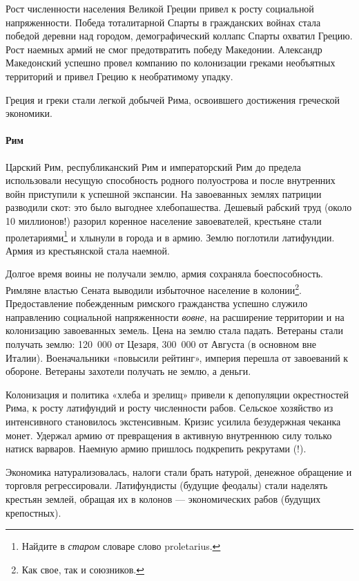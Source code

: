 Рост численности населения Великой Греции привел к росту социальной напряженности. Победа тоталитарной Спарты в
гражданских войнах стала победой деревни над городом, демографический коллапс Спарты охватил Грецию. Рост наемных армий
не смог предотвратить победу Македонии. Александр Македонский успешно провел компанию по колонизации греками необъятных
территорий и привел Грецию к необратимому упадку.

Греция и греки стали легкой добычей Рима, освоившего достижения греческой экономики.

\paragraph[Рим ]{Рим }
Царский Рим, республиканский Рим и императорский Рим до предела использовали несущую способность родного полуострова и после внутренних войн приступили к успешной экспансии. На завоеванных землях патриции разводили скот: это было
выгоднее хлебопашества. Дешевый рабский труд (около 10 миллионов!) разорил коренное население завоевателей, крестьяне
стали пролетариями\footnote{Найдите в \textit{старом} словаре слово
\foreignlanguage{english}{proletarius}.} и хлынули в города и в армию. Землю поглотили латифундии. Армия из
крестьянской стала наемной.

Долгое время воины не получали землю, армия сохраняла боеспособность. Римляне властью Сената выводили избыточное
население в колонии\footnote{Как свое, так и союзников.}. Предоставление побежденным римского
гражданства успешно служило направлению социальной напряженности \textit{вовне}, на расширение территории и на
колонизацию завоеванных земель. Цена на землю стала падать. Ветераны стали получать землю: 120~000 от Цезаря, 300~000
от Августа (в основном вне Италии). Военачальники «повысили рейтинг», империя перешла от завоеваний к обороне. Ветераны
захотели получать не землю, а деньги.


Колонизация и политика «хлеба и зрелищ» привели к депопуляции окрестностей Рима, к росту латифундий и росту численности
рабов. Сельское хозяйство из интенсивного становилось экстенсивным. Кризис усилила безудержная чеканка монет. Удержал
армию от превращения в активную внутреннюю силу только натиск варваров. Наемную армию пришлось подкрепить рекрутами
(!).


Экономика натурализовалась, налоги стали брать натурой, денежное обращение и торговля регрессировали. Латифундисты
(будущие феодалы) стали наделять крестьян землей, обращая их в колонов — экономических рабов (будущих крепостных).


